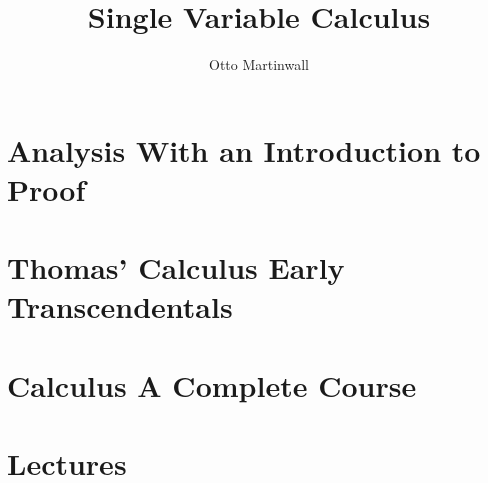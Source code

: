 

\title{Single Variable Calculus}
\author{Otto Martinwall}


\maketitle
\tableofcontents
\newpage


\let\olddefinition\definition
\let\oldtheorem\theorem
\renewcommand{\definition}{\olddefinition\normalfont}
\renewcommand{\theorem}{\oldtheorem\normalfont}

\section{Analysis With an Introduction to Proof}


\section{Thomas' Calculus Early Transcendentals}


\section{Calculus A Complete Course}



\section{Lectures}

